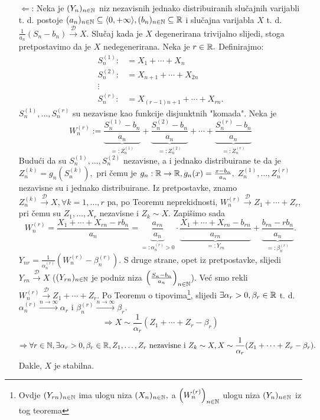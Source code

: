 \documentclass{article}
\begin{document}
\begin{enumerate}
    \item[\(\boxed{\Leftarrow}\):] Neka je \((Y_n)_{n\in\Bbb N}\) niz nezavisnih jednako distribuiranih slučajnih varijabli t. d. postoje \((a_n)_{n\in\Bbb N}\subseteq\langle0,+\infty\rangle,(b_n)_{n\in\Bbb N}\subseteq\Bbb R\) i slučajna varijabla \(X\) t. d. \(\frac1{a_n}(S_n-b_n)\overset{\mathcal D}{\longrightarrow}X.\) Slučaj kada je \(X\) degenerirana trivijalno slijedi, stoga pretpostavimo da je \(X\) nedegenerirana. Neka je \(r\in\Bbb R.\) Definirajmo: \[\begin{aligned}S_n^{(1)}:&=X_1+\cdots+X_n\\S_n^{(2)}:&=X_{n+1}+\cdots+X_{2n}\\\vdots&\\S_n^{(r)}:&=X_{(r-1)n+1}+\cdots+X_{rn}.\end{aligned}\] \(S_n^{(1)},\ldots,S_n^{(r)}\) su nezavisne kao funkcije disjunktnih "komada". Neka je \[W_n^{(r)}:=\underbrace{\frac{S_n^{(1)}-b_n}{a_n}}_{=:Z_n^{(1)}}+\underbrace{\frac{S_n^{(2)}-b_n}{a_n}}_{=:Z_n^{(2)}}+\cdots+\underbrace{\frac{S_n^{(r)}-b_n}{a_n}}_{=:Z_n^{(r)}}\] Budući da su \(S_n^{(1)},\ldots,S_n^{(2)}\) nezavisne, a i jednako distribuirane te da je \(Z_n^{(k)}=g_n\left(S_n^{(k)}\right),\) pri čemu je \(g_n:\Bbb R\to\Bbb R,g_n(x)=\frac{x-b_n}{a_n},\) \(Z_n^{(1)},\ldots,Z_n^{(r)}\) nezavisne su i jednako distribuirane. Iz pretpostavke, znamo  \(Z_n^{(k)}\overset{\mathcal D}{\longrightarrow}X,\forall k=1,\ldots, r\) pa, po Teoremu neprekidnosti, \(W_n^{(r)}\overset{\mathcal D}{\longrightarrow}Z_1+\cdots+Z_r,\) pri čemu su \(Z_1,\ldots,X_r\) nezavisne i \(Z_k\sim X.\) Zapišimo sada \[W_n^{(r)}=\frac{X_1+\cdots+X_{rn}-rb_n}{a_n}=\underbrace{\frac{a_{rn}}{a_n}}_{=:\alpha_n^{(r)}>0}\cdot\underbrace{\frac{X_1+\cdots+X_{rn}-b_{rn}}{a_{rn}}}_{=:Y_{rn}}+\underbrace{\frac{b_{rn}-rb_n}{a_n}}_{=:\beta_n^{(r)}}.\] \(Y_{nr}=\frac1{\alpha_n^{(r)}}\left(W_n^{(r)}-\beta_n^{(r)}\right).\) S druge strane, opet iz pretpostavke, slijedi \(Y_{rn}\overset{\mathcal D}{\longrightarrow}X\) (\((Y_{rn})_{n\in\Bbb N}\) je podniz niza \(\left(\frac{S_n-b_n}{a_n}\right)_{n\in\Bbb N}\)). Već smo rekli \(W_n^{(r)}\overset{\mathcal D}{\longrightarrow}Z_1+\cdots+Z_r.\) Po Teoremu o tipovima\footnote[38]{Ovdje \((Y_{rn})_{n\in\Bbb N}\) ima ulogu niza \((X_n)_{n\in\Bbb N},\) a \(\left(W_n^{(r)}\right)_{n\in\Bbb N}\) ulogu niza \((Y_n)_{n\in\Bbb N}\) iz tog teorema}, slijedi \(\exists\alpha_r>0,\beta_r\in\Bbb R\) t. d. \(\alpha_n^{(r)}\overset{n\to\infty}{\longrightarrow}\alpha_r\) i \(\beta_n^{(r)}\overset{n\to\infty}{\longrightarrow}\beta_r.\) \[\Rightarrow X\sim\frac1{\alpha_r}(Z_1+\cdots+Z_r-\beta_r)\] \[\Rightarrow\forall r\in\Bbb N,\exists\alpha_r>0,\beta_r\in\Bbb R,Z_1,\ldots,Z_r\text{ nezavisne i }Z_k\sim X,X\sim\frac1{\alpha_r}(Z_1+\cdots+Z_r-\beta_r).\] Dakle, \(X\) je stabilna.
\end{enumerate}
\end{document}
